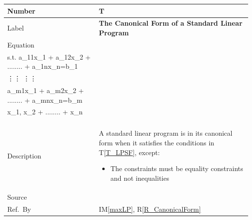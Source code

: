 \documentclass[12pt]{article}
\newcommand{\colAwidth}{0.13\textwidth}
\newcommand{\colBwidth}{0.82\textwidth}
\newcounter{theorynum} %
\newcommand{\tref}[1]{T\ref{#1}}
\newcommand{\iref}[1]{IM\ref{#1}}
\newcommand{\rref}[1]{R\ref{#1}}
\begin{document}
\noindent
\begin{minipage}{\textwidth}
	\renewcommand*{\arraystretch}{1.5}
	\begin{tabular}{| p{\colAwidth} | p{\colBwidth}|}
		\hline
		\rowcolor[gray]{0.9}
		Number& T{theorynum}\thetheorynum \label{T_SLPCF}\\
		\hline
		Label&\bf The Canonical Form of a Standard Linear Program\\
		\hline
		Equation&\[
		\left\{ 
		\begin{array}{c}
		max\;Z=\;\;\;c_{1}x_1 + c_{2}x_2 + ........ + c_{n}x_n \\ 
		s.\;t.\;\;\;\; a_{11}x_1 + a_{12}x_2 + ........ + 
		a_{1n}x_n\;=\;b_1 \\
		\hspace{1.3cm}\vdots \hspace{1.2cm}\vdots 
		\hspace{2.6cm}\vdots \hspace{1.5cm}\vdots \\
		\;\;\;\;\;\;\;\;\; a_{m1}x_1 + a_{m2}x_2 + ........ + 
		a_{mn}x_n\;=\;b_m \\
		x_1, x_2 + ........ + x_n\;{\geq}\;0 \\
		\end{array}
		\right. 
		\]\\
		\hline
		Description & 
		A standard linear program is in its canonical form when it satisfies 
		the conditions in \tref{T_LPSF}, except: \newline
		\begin{itemize}
			\item The constraints must be equality constraints and not 
			inequalities
		\end{itemize}\\
		\hline
		Source & \cite{lp-defs}\\
		\hline
		Ref.\ By & \iref{maxLP}, \rref{R_CanonicalForm}\\
		\hline
	\end{tabular}
\end{minipage}\\

~\newline
\end{document}

